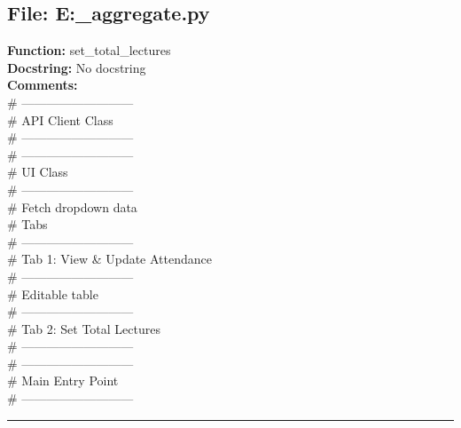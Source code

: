 {\subsection*{File: E:\project\capstone\frontend\faculty\attendance_aggregate.py}
\textbf{Function:} set_total_lectures\\
\textbf{Docstring:} No docstring\\
\textbf{Comments:}\\
# ---------------------------\\
# API Client Class\\
# ---------------------------\\
# ---------------------------\\
# UI Class\\
# ---------------------------\\
# Fetch dropdown data\\
# Tabs\\
# ---------------------------\\
# Tab 1: View & Update Attendance\\
# ---------------------------\\
# Editable table\\
# ---------------------------\\
# Tab 2: Set Total Lectures\\
# ---------------------------\\
# ---------------------------\\
# Main Entry Point\\
# ---------------------------\\

\hrule

}
